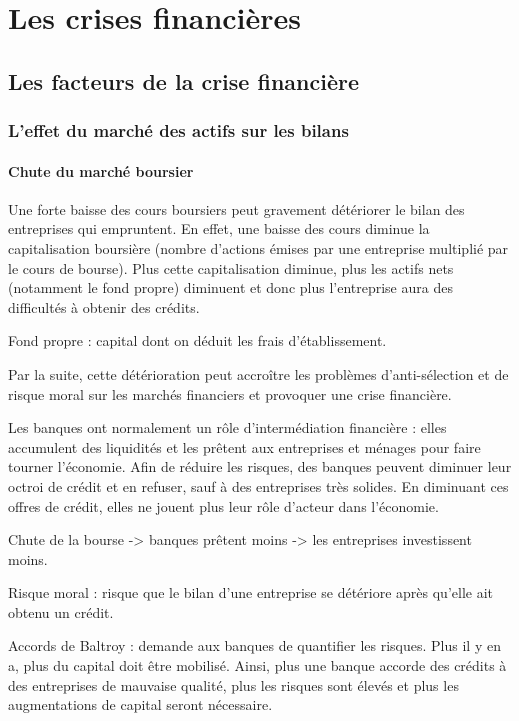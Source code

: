 \chapter{Les crises financières}

\section{Les facteurs de la crise financière}	
	
	\subsection{L'effet du marché des actifs sur les bilans}
	
		\subsubsection{Chute du marché boursier}
	
		Une forte baisse des cours boursiers peut gravement détériorer le bilan des entreprises qui empruntent. En effet, une baisse des cours diminue la capitalisation boursière (nombre d'actions émises par une entreprise multiplié par le cours de bourse). Plus cette capitalisation diminue, plus les actifs nets (notamment le fond propre) diminuent et donc plus l'entreprise aura des difficultés à obtenir des crédits.
	
		Fond propre : capital dont on déduit les frais d'établissement.
	
		Par la suite, cette détérioration peut accroître les problèmes d'anti-sélection et de risque moral sur les marchés financiers et provoquer une crise financière. 
	
		Les banques ont normalement un rôle d'intermédiation financière : elles accumulent des liquidités et les prêtent aux entreprises et ménages pour faire tourner l'économie. Afin de réduire les risques, des banques peuvent diminuer leur octroi de crédit et en refuser, sauf à des entreprises très solides. En diminuant ces offres de crédit, elles ne jouent plus leur rôle d'acteur dans l'économie.
	
		Chute de la bourse -> banques prêtent moins -> les entreprises investissent moins.

		Risque moral : risque que le bilan d'une entreprise se détériore après qu'elle ait obtenu un crédit.
	
		Accords de Baltroy : demande aux banques de quantifier les risques. Plus il y en a, plus du capital doit être mobilisé. Ainsi, plus une banque accorde des crédits à des entreprises de mauvaise qualité, plus les risques sont élevés et plus les augmentations de capital seront nécessaire.
		

